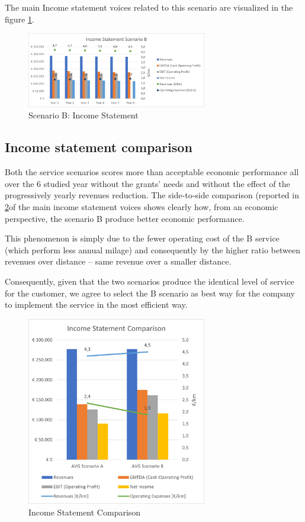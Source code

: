 The main Income statement voices related to this scenario are visualized in the figure \ref{fig:incstateB}.

\begin{figure}[h]
    \centering
    \includegraphics[width=0.7\textwidth]{Images/financial/income_statement_B.png}
    \caption{Scenario B: Income Statement}
    \label{fig:incstateB}
\end{figure}

\newpage

\subsection{Income statement comparison}
Both the service scenarios scores more than acceptable economic performance all over the 6 studied year without the grants’ needs and without the effect of the progressively yearly revenues reduction.
The side-to-side comparison (reported in \ref{fig:income_statement_comparison}of the main income statement voices shows clearly how, from an economic perspective, the scenario B produce better economic performance. 

This phenomenon is simply due to the fewer operating cost of the B service (which perform less annual milage) and consequently by the higher ratio between revenues over distance – same revenue over a smaller distance. 

Consequently, given that the two scenarios produce the identical level of service for the customer, we agree to select the B scenario as best way for the company to implement the service in the most efficient way.

\begin{figure}[h]
    \centering
    \includegraphics[width=0.7\textwidth]{Images/financial/Comparison.png}
    \caption{Income Statement Comparison}
    \label{fig:income_statement_comparison}
\end{figure}

